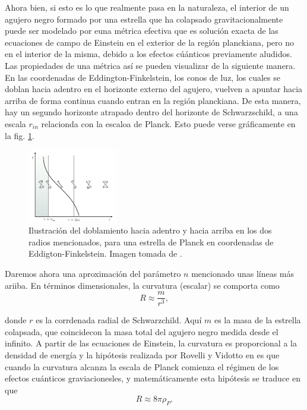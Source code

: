 \documentclass[16pt,a4paper]{article}
\numberwithin{equation}{section}
\theoremstyle{definition}
\begin{document}
Ahora bien, si esto es lo que realmente pasa en la naturaleza, el interior de un agujero negro formado por una estrella que ha colapsado gravitacionalmente puede ser modelado por euna métrica efectiva que es solución exacta de las ecuaciones de campo de Einstein en el exterior de la región planckiana, pero no en el interior de la misma, debido a los efectos cúánticos previamente aludidos. Las propiedades de una métrica así se pueden visualizar de la siguiente manera. En las coordenadas de Eddington-Finkelstein, los conos de luz, los cuales se doblan hacia adentro en el horizonte externo del agujero, vuelven a apuntar hacia arriba de forma continua cuando entran en la región planckiana. De esta manera, hay un segundo horizonte atrapado dentro del horizonte de Schwarzschild, a una escala $r_{in}$ relacionda con la escaloa de Planck. Esto puede verse gráficamente en la fig. \ref{fig: light cones}.
\begin{figure}[h!]
	\centering
	\includegraphics[width=0.35\textwidth]{lightcones}
	\caption{Ilustración del doblamiento hacia adentro y hacia arriba en los dos radios mencionados, para una estrella de Planck en coordenadas de Eddigton-Finkelstein. Imagen tomada de \cite{rovelli}.}
	\label{fig: light cones}
\end{figure}

Daremos ahora una aproximación del parámetro $n$ mencionado unas líneas más ariiba. En términos dimensionales, la curvatura (escalar) se comporta como
\begin{equation}
\label{curvature1}
R \approx \frac{m}{r^3},
\end{equation}

donde $r$ es la corrdenada radial de Schwarzchild. Aquí $m$ es la masa de la estrella colapsada, que coincidecon la masa total del agujero negro medida desde el infinito. A partir de las ecuaciones de Einstein, la curvatura es proporcional a la densidad de energía y la hipótesis realizada por Rovelli y Vidotto en \cite{rovelli} es que cuando la curvatura alcanza la escala de Planck comienza el régimen de los efectos cuánticos graviacionesles, y matemáticamente esta hipótesis se traduce en que
\begin{equation}
\label{curvature2}
R \approx 8\pi\rho_P.
\end{equation}
\end{document}
